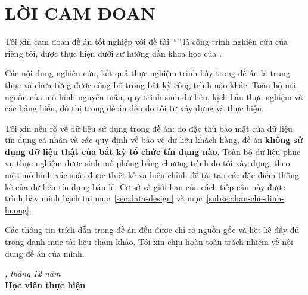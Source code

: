\chapter*{LỜI CAM ĐOAN}

Tôi xin cam đoan đề án tốt nghiệp với đề tài \textit{``\thesisTitle''} là công
trình nghiên cứu của riêng tôi, được thực hiện dưới sự hướng dẫn khoa học của
\thesisSupervisor.

Các nội dung nghiên cứu, kết quả thực nghiệm trình bày trong đề án là trung thực
và chưa từng được công bố trong bất kỳ công trình nào khác. Toàn bộ mã nguồn của
mô hình nguyên mẫu, quy trình sinh dữ liệu, kịch bản thực nghiệm và các bảng
biểu, đồ thị trong đề án đều do tôi tự xây dựng và thực hiện.

Tôi xin nêu rõ về dữ liệu sử dụng trong đề án: do đặc thù bảo mật của dữ liệu tín
dụng cá nhân và các quy định về bảo vệ dữ liệu khách hàng, đề án \textbf{không sử
dụng dữ liệu thật của bất kỳ tổ chức tín dụng nào}. Toàn bộ dữ liệu phục vụ thực
nghiệm được sinh mô phỏng bằng chương trình do tôi xây dựng, theo một mô hình xác
suất được thiết kế và hiệu chỉnh để tái tạo các đặc điểm thống kê của dữ liệu tín
dụng bán lẻ. Cơ sở và giới hạn của cách tiếp cận này được trình bày minh bạch tại
mục~\ref{sec:data-design} và mục~\ref{subsec:han-che-dinh-huong}.

Các thông tin trích dẫn trong đề án đều được chỉ rõ nguồn gốc và liệt kê đầy đủ
trong danh mục tài liệu tham khảo. Tôi xin chịu hoàn toàn trách nhiệm về nội dung
đề án của mình.

\vspace{1.4cm}

\hfill\begin{minipage}{0.45\textwidth}
\centering
\textit{\thesisCity, tháng 12 năm \thesisYear}\\[4pt]
\textbf{Học viên thực hiện}\\[2.2cm]
\textbf{\thesisAuthor}
\end{minipage}
